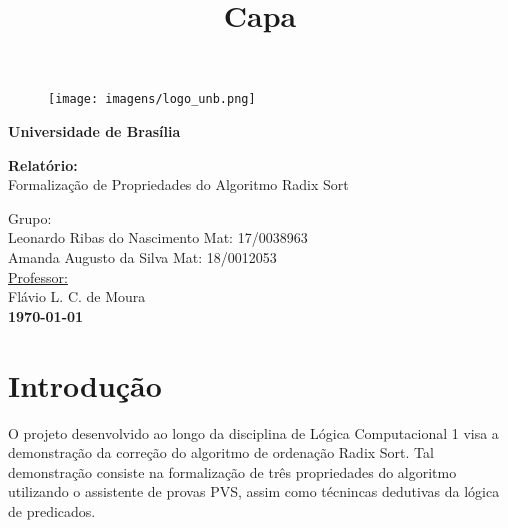 \documentclass[a4paper, 12pt]{article}
\begin{document}
\title{Capa}

\begin{titlepage}
	\begin{center}
		\begin{figure}[htb!]
			\begin{flushleft}
				\texttt{[image: imagens/logo\_unb.png]}
			\end{flushleft}
		\end{figure}
        \vspace{-2.5cm}
        \hspace{2.1cm}\Large{\textbf{Universidade de Brasília}}\\
        
        \vspace{200pt}
        
        \LARGE{\textbf{Relatório:}}\\ 
        \Large{Formalização de Propriedades do Algoritmo Radix Sort}\\
        
        \vspace{150pt}
        
        \hfill Grupo: \\
        
        \vspace{30pt} 
        \hfill Leonardo Ribas do Nascimento\hspace{20pt} Mat: 17/0038963\\
        \hfill Amanda Augusto da Silva\hspace{20pt} Mat: 18/0012053\\

        \vspace{25pt}
        \hfill \underline{Professor:}\\
        \hfill Flávio L. C. de Moura\\ 
        
        
        \vspace{\fill}
        \LARGE \bf{\today}
          
	\end{center}
\end{titlepage}


\newpage


\large
\section{Introdução}
O projeto desenvolvido ao longo da disciplina de Lógica Computacional 1 visa a demonstração da correção do algoritmo de ordenação Radix Sort. Tal demonstração consiste na formalização de três propriedades do algoritmo utilizando o assistente de provas PVS, assim como técnincas dedutivas da lógica de predicados.
\end{document}
